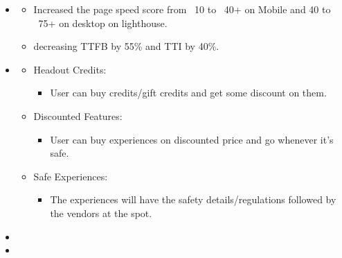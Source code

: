 \documentclass[a4paper,12pt]{memoir} %
\begin{document}
\userinformation %

\framebreak %

\begin{itemize}
\item{}
          \SmallSep
\begin{itemize}
        	\item Increased the page speed score from ~10 to ~40+ on Mobile and 40 to ~75+ on desktop on lighthouse.
    	    \item decreasing TTFB by 55\% and TTI by 40\%. 
            \end{itemize}
        \SmallSep
        \SmallSep
        \SmallSep
     \item{}
      \SmallSep
  \SmallSep
        \begin{itemize}
        	\item Headout Credits: 
        	\begin{itemize}
        	    \item User can buy credits/gift credits and get some discount on them. 
        	\end{itemize}
        	        	\item Discounted Features: 
        	\begin{itemize}
        	    \item User can buy experiences on discounted price and go whenever it's safe. 
        	\end{itemize}
        	        	\item Safe Experiences: 
        	\begin{itemize}
        	    \item The experiences will have the safety details/regulations followed by the vendors at the spot.
        	\end{itemize}
        	
            \end{itemize}
        \SmallSep
        \SmallSep
        \SmallSep
        \item{}
                \SmallSep
        \SmallSep
        \SmallSep
        \item{}
                \SmallSep
        \SmallSep
        \SmallSep
\end{itemize}
\end{document}
